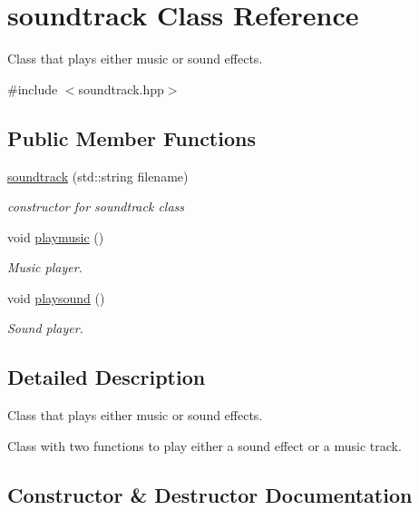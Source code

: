 \hypertarget{classsoundtrack}{}\section{soundtrack Class Reference}
\label{classsoundtrack}


Class that plays either music or sound effects.  




{\ttfamily \#include $<$soundtrack.\+hpp$>$}

\subsection*{Public Member Functions}
\begin{DoxyCompactItemize}
\item 
\hyperlink{classsoundtrack_add31bdeb1a693d541443f1d88586d3b6}{soundtrack} (std\+::string filename)
\begin{DoxyCompactList}\small\item\em constructor for soundtrack class \end{DoxyCompactList}\item 
void \hyperlink{classsoundtrack_a7569a4c0cde86548197756b8e05cf464}{playmusic} ()
\begin{DoxyCompactList}\small\item\em Music player. \end{DoxyCompactList}\item 
void \hyperlink{classsoundtrack_a9fbceb68f3fc032d79b4150deff560ea}{playsound} ()
\begin{DoxyCompactList}\small\item\em Sound player. \end{DoxyCompactList}\end{DoxyCompactItemize}


\subsection{Detailed Description}
Class that plays either music or sound effects. 

Class with two functions to play either a sound effect or a music track. 

\subsection{Constructor \& Destructor Documentation}
\mbox{\label{classsoundtrack_add31bdeb1a693d541443f1d88586d3b6}} 
